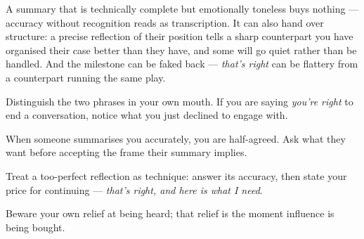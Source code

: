 \begin{failure}
A summary that is technically complete but emotionally toneless buys nothing --- accuracy without recognition reads as transcription. It can also hand over structure: a precise reflection of their position tells a sharp counterpart you have organised their case better than they have, and some will go quiet rather than be handled. And the milestone can be faked back --- \emph{that's right} can be flattery from a counterpart running the same play.
\end{failure}
\begin{countermeasures}
  \item Distinguish the two phrases in your own mouth. If you are saying \emph{you're right} to end a conversation, notice what you just declined to engage with.
  \item When someone summarises you accurately, you are half-agreed. Ask what they want before accepting the frame their summary implies.
  \item Treat a too-perfect reflection as technique: answer its accuracy, then state your price for continuing --- \emph{that's right, and here is what I need}.
  \item Beware your own relief at being heard; that relief is the moment influence is being bought.
\end{countermeasures}

\seesources
{}
